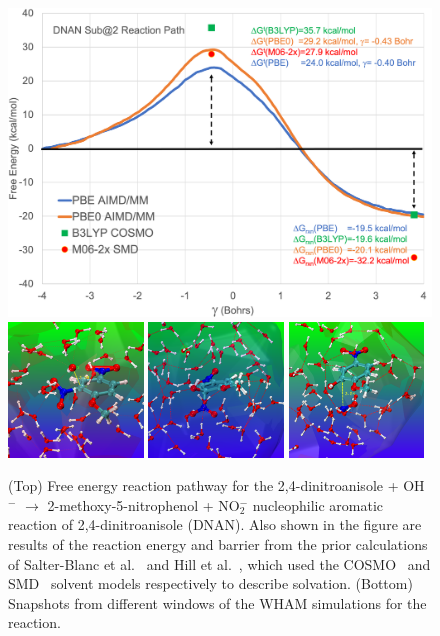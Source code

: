 \documentclass[runningheads,a4paper]{llncs}
\begin{document}
\begin{figure}[!h]
   \centering
    \includegraphics[width=1.0\textwidth]{images/DNAN-4-OH-pathway.png}
   \includegraphics[width=0.32\textwidth]{images/wham30m.pdf}
   \includegraphics[width=0.32\textwidth]{images/wham00.pdf}
   \includegraphics[width=0.32\textwidth]{images/wham40.pdf}
   \caption{(Top) Free energy reaction pathway for the 2,4-dinitroanisole + OH$^-$ $\rightarrow$ 2-methoxy-5-nitrophenol + NO$_2^-$ nucleophilic aromatic reaction of 2,4-dinitroanisole (DNAN). Also shown in the figure are results of the reaction energy and barrier from the prior calculations of Salter-Blanc et al.~\cite{salter2013mechanisms} and Hill et al.~\cite{hill2012dft}, which used the COSMO~\cite{klamt1993cosmo} and SMD~\cite{marenich2009universal} solvent models respectively to describe solvation. (Bottom) Snapshots from different windows of the WHAM simulations for the reaction.}
   \label{fig.enviro.hydrolysis}
\end{figure}
\end{document}
